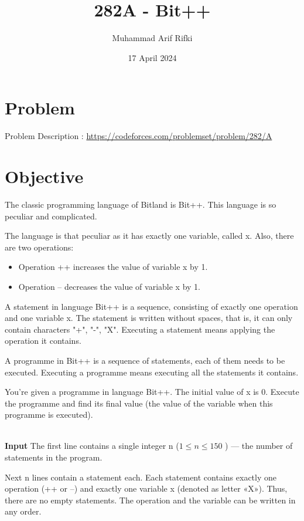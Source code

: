 \documentclass{article}
\title{282A - Bit++}
\author{Muhammad Arif Rifki}
\date{17 April 2024}
\begin{document}
\maketitle


\section{Problem}

Problem Description : \href{https://codeforces.com/problemset/problem/282/A}{https://codeforces.com/problemset/problem/282/A}

\section{Objective}
The classic programming language of Bitland is Bit++. This language is so peculiar and complicated.

The language is that peculiar as it has exactly one variable, called x. Also, there are two operations:

\begin{itemize}
    \item Operation ++ increases the value of variable x by 1.
    \item Operation -- decreases the value of variable x by 1.
\end{itemize}

A statement in language Bit++ is a sequence, consisting of exactly one operation and one variable x. The statement is written without spaces, that is, it can only contain characters "+", "-", "X". Executing a statement means applying the operation it contains.

A programme in Bit++ is a sequence of statements, each of them needs to be executed. Executing a programme means executing all the statements it contains.

You're given a programme in language Bit++. The initial value of x is 0. Execute the programme and find its final value (the value of the variable when this programme is executed).

\\\textbf{Input}
The first line contains a single integer n ($1 \leq n \leq 150$
) — the number of statements in the program.

Next n lines contain a statement each. Each statement contains exactly one operation (++ or --) and exactly one variable x (denoted as letter «X»). Thus, there are no empty statements. The operation and the variable can be written in any order.
\end{document}
